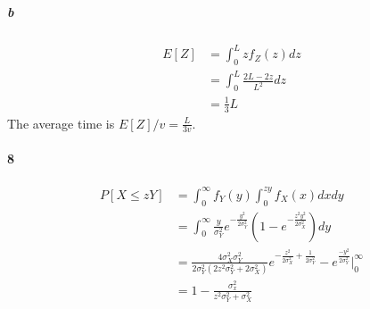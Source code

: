 \documentclass[22pt]{article}
\begin{document}
	\subparagraph{b}
	\begin{align}
	E[Z] & = \int_{0}^{L} zf_Z(z) dz\\
	& = \int_{0}^{L}\frac{2L-2z}{L^2} dz\\
	& = \frac{1}{3}L
	\end{align}
	The average time is $E[Z]/v = \frac{L}{3v}$.

	\paragraph{8}
	\begin{align}
	P[X\leq zY] & = \int_{0}^{\infty} f_Y(y)\int_{0}^{zy}f_X(x)dxdy\\
	& = \int_{0}^{\infty} \frac{y}{\sigma_Y^2}e^{-\frac{y^2}{2 \sigma^2_Y}}(1-e^{-\frac{z^2y^2}{2 \sigma^2_X}})dy\\
	& = \frac{4 \sigma^2_X \sigma^2_Y}{2 \sigma^2_Y(2z^2 \sigma^2_Y+2 \sigma^2_X)}e^{-\frac{z^2}{2 \sigma^2_X}+ \frac{1}{2 \sigma^2_Y}} - e^{\frac{-y^2}{2 \sigma_Y^2}}|^\infty_0\\
	& = 1-\frac{\sigma^2_x}{z^2 \sigma^2_Y + \sigma_X^2}
	\end{align}
\end{document}
